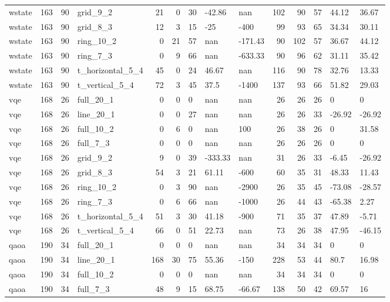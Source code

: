 \begin{longtable}{lrrlrrlllrrlll}
wstate & 163 & 90 & grid\_9\_2 & 21 & 0 & 30 & -42.86 & nan & 102 & 90 & 57 & 44.12 & 36.67 \\
wstate & 163 & 90 & grid\_8\_3 & 12 & 3 & 15 & -25 & -400 & 99 & 93 & 65 & 34.34 & 30.11 \\
wstate & 163 & 90 & ring\_10\_2 & 0 & 21 & 57 & nan & -171.43 & 90 & 102 & 57 & 36.67 & 44.12 \\
wstate & 163 & 90 & ring\_7\_3 & 0 & 9 & 66 & nan & -633.33 & 90 & 96 & 62 & 31.11 & 35.42 \\
wstate & 163 & 90 & t\_horizontal\_5\_4 & 45 & 0 & 24 & 46.67 & nan & 116 & 90 & 78 & 32.76 & 13.33 \\
wstate & 163 & 90 & t\_vertical\_5\_4 & 72 & 3 & 45 & 37.5 & -1400 & 137 & 93 & 66 & 51.82 & 29.03 \\
vqe & 168 & 26 & full\_20\_1 & 0 & 0 & 0 & nan & nan & 26 & 26 & 26 & 0 & 0 \\
vqe & 168 & 26 & line\_20\_1 & 0 & 0 & 27 & nan & nan & 26 & 26 & 33 & -26.92 & -26.92 \\
vqe & 168 & 26 & full\_10\_2 & 0 & 6 & 0 & nan & 100 & 26 & 38 & 26 & 0 & 31.58 \\
vqe & 168 & 26 & full\_7\_3 & 0 & 0 & 0 & nan & nan & 26 & 26 & 26 & 0 & 0 \\
vqe & 168 & 26 & grid\_9\_2 & 9 & 0 & 39 & -333.33 & nan & 31 & 26 & 33 & -6.45 & -26.92 \\
vqe & 168 & 26 & grid\_8\_3 & 54 & 3 & 21 & 61.11 & -600 & 60 & 35 & 31 & 48.33 & 11.43 \\
vqe & 168 & 26 & ring\_10\_2 & 0 & 3 & 90 & nan & -2900 & 26 & 35 & 45 & -73.08 & -28.57 \\
vqe & 168 & 26 & ring\_7\_3 & 0 & 6 & 66 & nan & -1000 & 26 & 44 & 43 & -65.38 & 2.27 \\
vqe & 168 & 26 & t\_horizontal\_5\_4 & 51 & 3 & 30 & 41.18 & -900 & 71 & 35 & 37 & 47.89 & -5.71 \\
vqe & 168 & 26 & t\_vertical\_5\_4 & 66 & 0 & 51 & 22.73 & nan & 73 & 26 & 38 & 47.95 & -46.15 \\
qaoa & 190 & 34 & full\_20\_1 & 0 & 0 & 0 & nan & nan & 34 & 34 & 34 & 0 & 0 \\
qaoa & 190 & 34 & line\_20\_1 & 168 & 30 & 75 & 55.36 & -150 & 228 & 53 & 44 & 80.7 & 16.98 \\
qaoa & 190 & 34 & full\_10\_2 & 0 & 0 & 0 & nan & nan & 34 & 34 & 34 & 0 & 0 \\
qaoa & 190 & 34 & full\_7\_3 & 48 & 9 & 15 & 68.75 & -66.67 & 138 & 50 & 42 & 69.57 & 16 \\

\end{longtable}

